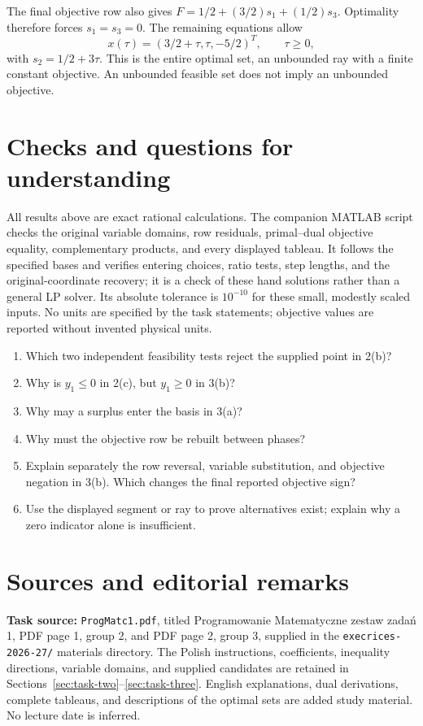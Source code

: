 \documentclass[11pt,a4paper]{article}
\begin{document}
The final objective row also gives
$F=1/2+(3/2)s_1+(1/2)s_3$.
Optimality therefore forces $s_1=s_3=0$. The remaining equations allow
\[
  x(\tau)=(3/2+\tau,\tau,-5/2)^T,\qquad \tau\geq0,
\]
with $s_2=1/2+3\tau$. This is the entire optimal set, an unbounded ray
with a finite constant objective. An unbounded feasible set does not imply
an unbounded objective.

\section{Checks and questions for understanding}\label{sec:checks}
All results above are exact rational calculations. The companion MATLAB
script checks the original variable domains, row residuals, primal--dual
objective equality, complementary products, and every displayed tableau.
It follows the specified bases and verifies entering choices, ratio tests,
step lengths, and the original-coordinate recovery; it is a check of these
hand solutions rather than a general LP solver.
Its absolute tolerance is $10^{-10}$ for these small, modestly scaled inputs.
No units are specified by the task statements; objective values are reported
without invented physical units.

\begin{enumerate}[leftmargin=*]
  \item Which two independent feasibility tests reject the supplied point in 2(b)?
  \item Why is $y_1\leq0$ in 2(c), but $y_1\geq0$ in 3(b)?
  \item Why may a surplus enter the basis in 3(a)?
  \item Why must the objective row be rebuilt between phases?
  \item Explain separately the row reversal, variable substitution, and
        objective negation in 3(b). Which changes the final reported objective sign?
  \item Use the displayed segment or ray to prove alternatives exist;
        explain why a zero indicator alone is insufficient.
\end{enumerate}

\section{Sources and editorial remarks}\label{sec:sources}
\textbf{Task source:} \texttt{ProgMatc1.pdf}, titled
\foreignlanguage{polish}{Programowanie Matematyczne zestaw zadań 1},
PDF page 1, group 2, and PDF page 2, group 3, supplied in the
\texttt{execrices-2026-27/} materials directory. The Polish instructions,
coefficients, inequality directions, variable domains, and supplied candidates
are retained in Sections~\ref{sec:task-two}--\ref{sec:task-three}.
English explanations, dual derivations, complete tableaus, and descriptions
of the optimal sets are added study material. No lecture date is inferred.
\end{document}
